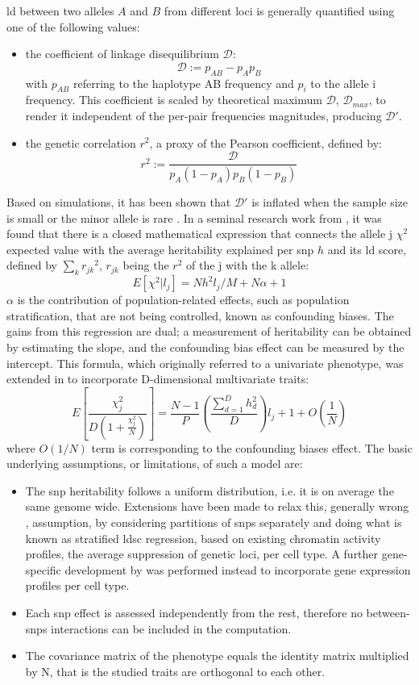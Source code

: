 \Ac{ld} between two alleles $A$ and $B$ from different loci is generally quantified using one of the following values: 
\begin{itemize}
\item{
the coefficient of linkage disequilibrium $\mathcal{D}$:
$$
\mathcal{D} := p_{AB} - p_Ap_B
$$
with $p_{AB}$ referring to the haplotype AB frequency and $p_i$ to the allele i frequency. This coefficient is scaled by theoretical maximum $\mathcal{D}$, $\mathcal{D}_{max}$, to render it independent of the per-pair frequencies magnitudes, producing $\mathcal{D}'$.
}
\item{
the genetic correlation $r^2$, a proxy of the Pearson coefficient, defined by:
$$
r^2:= \frac{\mathcal{D}}{p_A(1-p_A)p_B(1-p_B)}
$$
}
\end{itemize}
Based on simulations, it has been shown that $\mathcal{D}'$ is inflated when the sample size is small or the minor allele is rare \cite{Teare2002}.  In a seminal research work from \citet{Bulik-Sullivan2015}, it was found that there is a closed mathematical expression that connects the allele j $\chi^2$ expected value  with the average heritability explained per \ac{snp} $h$ and its \ac{ld} score, defined by $\sum_k{{r_{jk}}^2}$, $r_{jk}$ being the $r^2$ of the j with the k allele:
$$
E[\chi^2|l_j] = Nh^2l_j/M + N\alpha + 1
$$
$\alpha$ is the contribution of population-related effects, such as population stratification, that are not being controlled, known as confounding biases. The gains from this regression are dual; a measurement of heritability can be obtained by estimating the slope, and the confounding bias effect can be measured by the intercept. This formula, which originally referred to a univariate phenotype, was extended in \cite{Naqvi2021} to incorporate D-dimensional multivariate traits:
$$
E\left[\frac{\chi^2_j}{D\left(1+\frac{\chi^2_j}{N}\right)}\right] = \frac{N-1}{P}\left(\frac{\sum_{d=1}^{D}h_d^2}{D}\right)l_j +1 + O\left(\frac{1}{N}\right)
$$
where $O(1/N)$ term is corresponding to the confounding biases effect.
The basic underlying assumptions, or limitations, of such a model are:
\begin{itemize}
	\item{The \ac{snp} heritability follows a uniform distribution, i.e. it is on average the same genome wide. Extensions have been made to relax this, generally wrong \cite{Trynka2013}, assumption, by considering partitions of \acp{snp} separately and doing what is known as stratified \ac{ldsc} regression\cite{Finucane2015}, based on existing chromatin activity profiles, the average suppression of genetic loci, per cell type. A further gene-specific development by \citet{Finucane2018} was performed instead to incorporate gene expression profiles per cell type.}
	\item{Each \ac{snp} effect is assessed independently from the rest, therefore no between-\acp{snp} interactions can be included in the computation.}
	\item{The covariance matrix of the phenotype equals the identity matrix multiplied by N, that is the studied traits are orthogonal to each other.}
\end{itemize}

